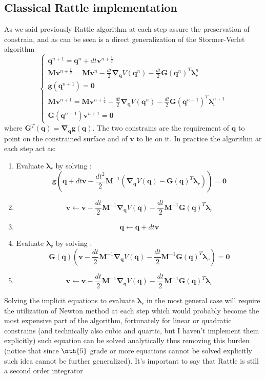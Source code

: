 \documentclass[10pt,a4paper]{article}
\begin{document}
\subsection{Classical Rattle implementation}
As we said previously Rattle algorithm at each step assure the preservation of constrain, and as can be seen is a direct generalization of the Stormer-Verlet algorithm
\[
\begin{cases}
\bm{q}^{n+1} =  \bm{q}^n + dt\bm{v}^{n+\frac{1}{2}}\\
\bm{M}\bm{v}^{n+\frac{1}{2}} = \bm{M}\bm{v}^n-\frac{dt}{2}\bm{\nabla}_{\bm q}V(\bm{q}^n)-\frac{dt}{2} \bm{G}(\bm{q}^n)^T\bm{\lambda}_r^n\\
\bm{g}(\bm{q}^{n+1}) = \bm{0}\\
\bm{M}\bm{v}^{n+1} = \bm{M}\bm{v}^{n+\frac{1}{2}}-\frac{dt}{2}\bm{\nabla}_{\bm q}V(\bm{q}^n)-\frac{dt}{2} \bm{G}(\bm{q}^{n+1})^T\bm{\lambda}_v^{n+1}\\
\bm{G}(\bm{q}^{n+1})\bm{v}^{n+1} = \bm{0}
\end{cases}
\]
where $\bm{G}^T(\bm{q})=\bm{\nabla}_{\bm q}\bm{g}(\bm{q})$. The two constrains are the requirement of $\bm{q}$ to point on the constrained surface and of $\bm{v}$ to lie on it.
In practice the algorithm ar each step act as:
\begin{enumerate}
	\item Evaluate $\bm{\lambda}_r$ by solving :
	\[ \bm{g}(\bm{q} + dt\bm{v}-\frac{dt^2}{2}\bm{M}^{-1}(\bm{\nabla}_{\bm q}V(\bm{q})-\bm{G}(\bm{q})^T\bm{\lambda}_r)) = \bm{0} \]
	\item 
	\[
	\bm{v} \leftarrow \bm{v}-\frac{dt}{2}\bm{M}^{-1}\bm{\nabla}_{\bm q}V(\bm{q})-\frac{dt}{2} \bm{M}^{-1}\bm{G}(\bm{q})^T\bm{\lambda}_r
	\]
	\item
	\[ \bm{q} \leftarrow  \bm{q} + dt\bm{v} \]
	\item Evaluate $\bm{\lambda}_v$ by solving :
	\[
	\bm{G}(\bm{q})(\bm{v}-\frac{dt}{2}\bm{M}^{-1}\bm{\nabla}_{\bm q}V(\bm{q})-\frac{dt}{2}\bm{M}^{-1} \bm{G}(\bm{q})^T\bm{\lambda}_v) = \bm{0}
	\]
	\item
	\[
	\bm{v} \leftarrow \bm{v}-\frac{dt}{2}\bm{M}^{-1}\bm{\nabla}_{\bm q}V(\bm{q})-\frac{dt}{2} \bm{M}^{-1}\bm{G}(\bm{q})^T\bm{\lambda}_v
	\]
\end{enumerate}
Solving the implicit equations to evaluate $\bm{\lambda}_r$ in the most general case will require the utilization of Newton method at each step which would probably become the most expensive part of the algorithm, fortunately for linear or quadratic constrains (and technically also cubic and quartic, but I haven't implement them explicitly) such equation can be solved analytically thus removing this burden (notice that since $\nth{5}$ grade or more equations cannot be solved explicitly such idea cannot be further generalized).
It's important to say that Rattle is still a second order integrator
\end{document}
